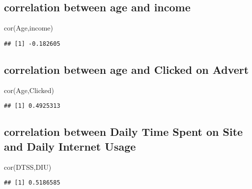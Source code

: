 \documentclass[
]{article}
\newenvironment{Shaded}{\begin{snugshade}}{\end{snugshade}}
\newcommand{\FunctionTok}[1]{\textcolor[rgb]{0.00,0.00,0.00}{#1}}
\newcommand{\NormalTok}[1]{#1}
\begin{document}
\hypertarget{correlation-between-age-and-income}{%
\subsection{correlation between age and
income}\label{correlation-between-age-and-income}}

\begin{Shaded}
\begin{Highlighting}[]
\FunctionTok{cor}\NormalTok{(Age,income)}
\end{Highlighting}
\end{Shaded}

\begin{verbatim}
## [1] -0.182605
\end{verbatim}

\hypertarget{correlation-between-age-and-clicked-on-advert}{%
\subsection{correlation between age and Clicked on
Advert}\label{correlation-between-age-and-clicked-on-advert}}

\begin{Shaded}
\begin{Highlighting}[]
\FunctionTok{cor}\NormalTok{(Age,Clicked)}
\end{Highlighting}
\end{Shaded}

\begin{verbatim}
## [1] 0.4925313
\end{verbatim}

\hypertarget{correlation-between-daily-time-spent-on-site-and-daily-internet-usage}{%
\subsection{correlation between Daily Time Spent on Site and Daily
Internet
Usage}\label{correlation-between-daily-time-spent-on-site-and-daily-internet-usage}}

\begin{Shaded}
\begin{Highlighting}[]
\FunctionTok{cor}\NormalTok{(DTSS,DIU)}
\end{Highlighting}
\end{Shaded}

\begin{verbatim}
## [1] 0.5186585
\end{verbatim}
\end{document}
